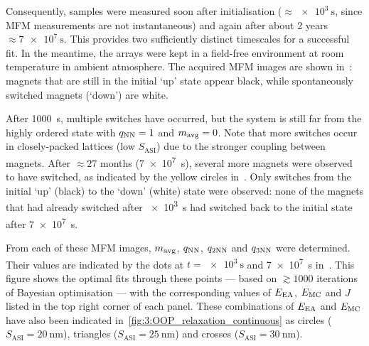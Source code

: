 

Consequently, samples were measured soon after initialisation ($\approx \SI{e3}{\second}$, since MFM measurements are not instantaneous) and again after about 2 years $\approx \SI{7e7}{\second}$.
This provides two sufficiently distinct timescales for a successful fit.
In the meantime, the arrays were kept in a field-free environment at room temperature in ambient atmosphere.
The acquired MFM images are shown in~: magnets that are still in the initial `up' state appear black, while spontaneously switched magnets (`down') are white. \par
After \SI{1000}{\second}, multiple switches have occurred, but the system is still far from the highly ordered state with $\qNN=1$ and $\mavg=0$.
Note that more switches occur in closely-packed lattices (low $S_\mathrm{ASI}$) due to the stronger coupling between magnets.
After $\approx 27$ months (\SI{7e7}{\second}), several more magnets were observed to have switched, as indicated by the yellow circles in~.
Only switches from the initial `up' (black) to the `down' (white) state were observed: none of the magnets that had already switched after \SI{e3}{\second} had switched back to the initial state after \SI{7e7}{\second}. \par
From each of these MFM images, $\mavg$, $\qNN$, $\qNN[2]$ and $\qNN[3]$ were determined.
Their values are indicated by the dots at $t=\SI{e3}{\second}$ and \SI{7e7}{\second} in~.
This figure shows the optimal fits through these points --- based on $\gtrsim 1000$ iterations of Bayesian optimisation --- with the corresponding values of $\EEA$, $\EMC$ and $J$ listed in the top right corner of each panel.
These combinations of $\EEA$ and $\EMC$ have also been indicated in~\cref{fig:3:OOP_relaxation_continuous} as circles ($S_\mathrm{ASI}=\SI{20}{\nano\metre}$), triangles ($S_\mathrm{ASI}=\SI{25}{\nano\metre}$) and crosses ($S_\mathrm{ASI}=\SI{30}{\nano\metre}$).


